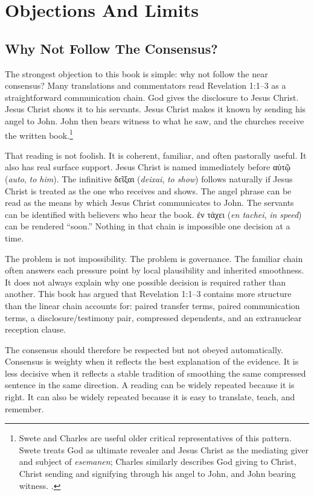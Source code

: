 \chapter{Objections And Limits}

\section{Why Not Follow The Consensus?}

The strongest objection to this book is simple: why not follow the near consensus? Many translations and commentators read Revelation 1:1--3 as a straightforward communication chain. God gives the disclosure to Jesus Christ. Jesus Christ shows it to his servants. Jesus Christ makes it known by sending his angel to John. John then bears witness to what he saw, and the churches receive the written book.\footnote{Swete and Charles are useful older critical representatives of this pattern. Swete treats God as ultimate revealer and Jesus Christ as the mediating giver and subject of \textit{esemanen}; Charles similarly describes God giving to Christ, Christ sending and signifying through his angel to John, and John bearing witness. \autocites[1--2]{swete1911apocalypse}[1, 5--7]{charles1920revelation}.}

That reading is not foolish. It is coherent, familiar, and often pastorally useful. It also has real surface support. Jesus Christ is named immediately before \textgreek{αὐτῷ} (\textit{auto}, \textit{to him}). The infinitive \textgreek{δεῖξαι} (\textit{deixai}, \textit{to show}) follows naturally if Jesus Christ is treated as the one who receives and shows. The angel phrase can be read as the means by which Jesus Christ communicates to John. The servants can be identified with believers who hear the book. \textgreek{ἐν τάχει} (\textit{en tachei}, \textit{in speed}) can be rendered ``soon.'' Nothing in that chain is impossible one decision at a time.

The problem is not impossibility. The problem is governance. The familiar chain often answers each pressure point by local plausibility and inherited smoothness. It does not always explain why one possible decision is required rather than another. This book has argued that Revelation 1:1--3 contains more structure than the linear chain accounts for: paired transfer terms, paired communication terms, a disclosure/testimony pair, compressed dependents, and an extranuclear reception clause.

The consensus should therefore be respected but not obeyed automatically. Consensus is weighty when it reflects the best explanation of the evidence. It is less decisive when it reflects a stable tradition of smoothing the same compressed sentence in the same direction. A reading can be widely repeated because it is right. It can also be widely repeated because it is easy to translate, teach, and remember.

